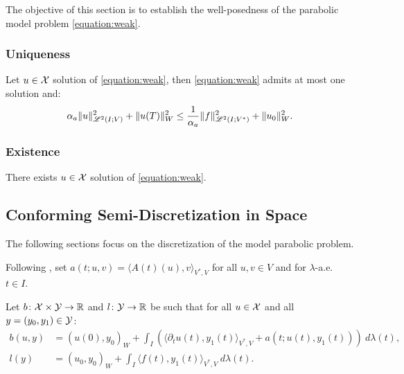 The objective of this section is to establish the well-posedness of the parabolic model problem \cref{equation:weak}.

\subsubsection{Uniqueness}

\begin{lemma}
    Let $u \in \mathcal{X}$ solution of \cref{equation:weak}, then \cref{equation:weak} admits at most one solution and:
    \begin{align}
        \alpha_{a} \lVert u \rVert_{\mathscr{L}^{2}(I; V)}^2 + \lVert u(T) \rVert_W^2 \leq \frac{1}{\alpha_{a}} \lVert f \rVert_{\mathscr{L}^{2}(I; V^*)}^2 + \lVert u_0 \rVert_W^2.
    \end{align}
\end{lemma}



\subsubsection{Existence}

\begin{lemma}[Existence]
    There exists $u \in \mathcal{X}$ solution of \cref{equation:weak}.
\end{lemma}


\newpage
\subsection{Conforming Semi-Discretization in Space}

The following sections focus on the discretization of the model parabolic problem.

Following \cite[p.~135]{Ern2021}, set $a(t; u, v) = \langle A(t)(u), v \rangle_{V^*, V}$ for all $u, v \in V$ and for $\lambda$-a.e. $t \in I$.

\begin{definition}[$b$ and $l$]
    Let $b \colon \mathcal{X} \times \mathcal{Y} \rightarrow \mathbb{R}$ and $l \colon \mathcal{Y} \rightarrow \mathbb{R}$ be such that for all $u \in \mathcal{X}$ and all $y = (y_0, y_1) \in \mathcal{Y}$:
    \begin{align}
        b(u, y) &= \left( u(0), y_0 \right)_W + \int_I \left( \langle \partial_t u(t), y_1(t) \rangle_{V^*, V} + a(t; u(t), y_1(t)) \right)~ d \lambda(t), \\
        l(y) &= \left( u_0, y_0 \right)_W + \int_I \langle f(t), y_1(t) \rangle_{V^*, V} ~ d \lambda(t).
    \end{align}
\end{definition}

